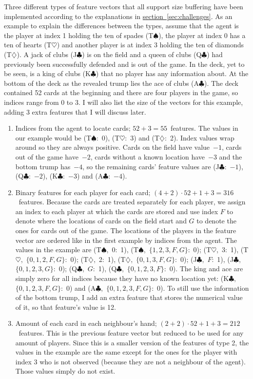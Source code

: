 \documentclass[a4paper,titlepage]{article}
\begin{document}
Three different types of feature vectors that all support size buffering have been implemented according to the explanations in \hyperref[sec:challenges]{section~\ref*{sec:challenges}}.
As an example to explain the differences between the types, assume that the agent is the player at index 1 holding the ten of spades (T$\spadesuit$), the player at index 0 has a ten of hearts (T$\heartsuit$) and another player is at index 3 holding the ten of diamonds (T$\diamondsuit$). A jack of clubs (J$\clubsuit$) is on the field and a queen of clubs (Q$\clubsuit$) had previously been successfully defended and is out of the game. In the deck, yet to be seen, is a king of clubs (K$\clubsuit$) that no player has any information about. At the bottom of the deck as the revealed trump lies the ace of clubs (A$\clubsuit$). The deck contained 52 cards at the beginning and there are four players in the game, so indices range from 0 to 3. I will also list the size of the vectors for this example, adding 3 extra features that I will discuss later.
\begin{enumerate} %
  \item Indices from the agent to locate cards; $52 + 3 = 55$~features. The values in our example would be (T$\spadesuit$:~0), (T$\heartsuit$:~3) and (T$\diamondsuit$:~2). Index values wrap around so they are always positive. Cards on the field have value~$-1$, cards out of the game have~$-2$, cards without a known location have~$-3$ and the bottom trump has~$-4$, so the remaining cards' feature values are (J$\clubsuit$:~$-1$), (Q$\clubsuit$:~$-2$), (K$\clubsuit$:~$-3$) and (A$\clubsuit$:~$-4$).
  \item Binary features for each player for each card; $(4 + 2) \cdot 52  + 1 + 3 = 316$~features. Because the cards are treated separately for each player, we assign an index to each player at which the cards are stored and use index $F$ to denote where the locations of cards on the field start and $G$ to denote the ones for cards out of the game. The locations of the players in the feature vector are ordered like in the first example by indices from the agent. The values in the example are (T$\spadesuit$,~0:~1), (T$\spadesuit$,~$\{1, 2, 3, F, G\}$:~0); (T$\heartsuit$,~3:~1), (T$\heartsuit$,~$\{0, 1, 2, F, G\}$:~0); (T$\diamondsuit$,~2:~1), (T$\diamondsuit$,~$\{0, 1, 3, F, G\}$:~0); (J$\clubsuit$,~$F$:~1), (J$\clubsuit$,~$\{0, 1, 2, 3, G\}$:~0); (Q$\clubsuit$,~$G$:~1), (Q$\clubsuit$,~$\{0, 1, 2, 3, F\}$:~0).
  The king and ace are simply zero for all indices because they have no known location yet: (K$\clubsuit$,~$\{0, 1, 2, 3, F, G\}$:~0) and (A$\clubsuit$,~$\{0, 1, 2, 3, F, G\}$:~0). To still use the information of the bottom trump, I add an extra feature that stores the numerical value of it, so that feature's value is 12.
  \item Amount of each card in each neighbour's hand; $(2 + 2) \cdot 52 + 1 + 3 = 212$~features. This is the previous feature vector but reduced to be used for any amount of players. Since this is a smaller version of the features of type 2, the values in the example are the same except for the ones for the player with index 3 who is not observed (because they are not a neighbour of the agent). Those values simply do not exist.
\end{enumerate}
\end{document}
